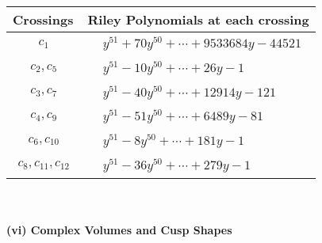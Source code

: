 \documentclass[1p]{elsarticle_modified}
\theoremstyle{definition}
\begin{document}
\begin{tabular}{m{50pt}|m{274pt}}
Crossings & \hspace{64pt}Riley Polynomials at each crossing \\
\hline $$\begin{aligned}c_{1}\end{aligned}$$&$\begin{aligned}
&y^{51}+70 y^{50}+\cdots+9533684 y-44521
\end{aligned}$\\
\hline $$\begin{aligned}c_{2},c_{5}\end{aligned}$$&$\begin{aligned}
&y^{51}-10 y^{50}+\cdots+26 y-1
\end{aligned}$\\
\hline $$\begin{aligned}c_{3},c_{7}\end{aligned}$$&$\begin{aligned}
&y^{51}-40 y^{50}+\cdots+12914 y-121
\end{aligned}$\\
\hline $$\begin{aligned}c_{4},c_{9}\end{aligned}$$&$\begin{aligned}
&y^{51}-51 y^{50}+\cdots+6489 y-81
\end{aligned}$\\
\hline $$\begin{aligned}c_{6},c_{10}\end{aligned}$$&$\begin{aligned}
&y^{51}-8 y^{50}+\cdots+181 y-1
\end{aligned}$\\
\hline $$\begin{aligned}c_{8},c_{11},c_{12}\end{aligned}$$&$\begin{aligned}
&y^{51}-36 y^{50}+\cdots+279 y-1
\end{aligned}$\\
\hline
\end{tabular}\\~\\
\newpage\flushleft \textbf{(vi) Complex Volumes and Cusp Shapes}
\end{document}
